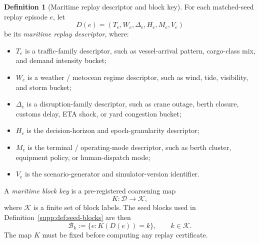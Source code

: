 \documentclass[11pt]{article}
\newcommand{\1}{\mathbf{1}}
\theoremstyle{definition}
\newtheorem{definition}{Definition}[section]
\theoremstyle{plain}
\theoremstyle{remark}
\begin{document}
\begin{definition}[Maritime replay descriptor and block key]
\label{supp:def:maritime-block-key}
For each matched-seed replay episode $e$, let
\[
D(e)=(T_e,W_e,\Delta_e,H_e,M_e,V_e)
\]
be its \emph{maritime replay descriptor}, where:
\begin{itemize}[leftmargin=1.7em]
\item $T_e$ is a traffic-family descriptor, such as vessel-arrival pattern, cargo-class mix, and demand intensity bucket;
\item $W_e$ is a weather / metocean regime descriptor, such as wind, tide, visibility, and storm bucket;
\item $\Delta_e$ is a disruption-family descriptor, such as crane outage, berth closure, customs delay, ETA shock, or yard congestion bucket;
\item $H_e$ is the decision-horizon and epoch-granularity descriptor;
\item $M_e$ is the terminal / operating-mode descriptor, such as berth cluster, equipment policy, or human-dispatch mode;
\item $V_e$ is the scenario-generator and simulator-version identifier.
\end{itemize}
A \emph{maritime block key} is a pre-registered coarsening map
\[
K:\mathcal D\to \mathcal K,
\]
where $\mathcal K$ is a finite set of block labels. The seed blocks used in Definition~\ref{supp:def:seed-blocks} are then
\[
\mathcal B_k:=\{e:K(D(e))=k\}, \qquad k\in\mathcal K.
\]
The map $K$ must be fixed before computing any replay certificate.
\end{definition}
\end{document}
